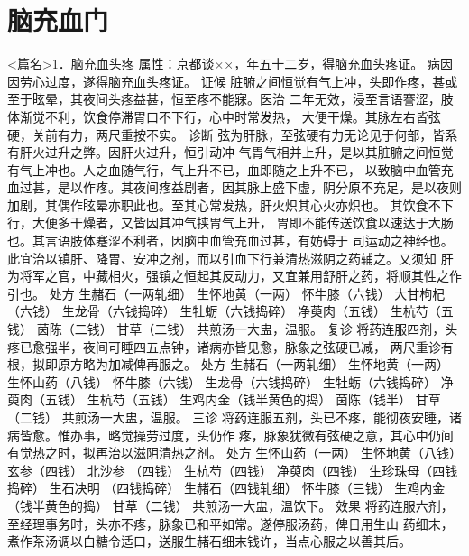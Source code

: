 \documentclass[a4paper,12pt,UTF8,twoside]{ctexbook}
\begin{document}
\chapter{脑充血门}
<篇名>1．脑充血头疼
属性：京都谈××，年五十二岁，得脑充血头疼证。 
病因 因劳心过度，遂得脑充血头疼证。 
证候 脏腑之间恒觉有气上冲，头即作疼，甚或至于眩晕，其夜间头疼益甚，恒至疼不能寐。医治 
二年无效，浸至言语謇涩，肢体渐觉不利，饮食停滞胃口不下行，心中时常发热， 
大便干燥。其脉左右皆弦硬，关前有力，两尺重按不实。 
诊断 弦为肝脉，至弦硬有力无论见于何部，皆系有肝火过升之弊。因肝火过升，恒引动冲 
气胃气相并上升，是以其脏腑之间恒觉有气上冲也。人之血随气行，气上升不已，血即随之上升不已， 
以致脑中血管充血过甚，是以作疼。其夜间疼益剧者，因其脉上盛下虚，阴分原不充足，是以夜则 
加剧，其偶作眩晕亦职此也。至其心常发热，肝火炽其心火亦炽也。 
其饮食不下行，大便多干燥者，又皆因其冲气挟胃气上升， 
胃即不能传送饮食以速达于大肠也。其言语肢体蹇涩不利者，因脑中血管充血过甚，有妨碍于 
司运动之神经也。此宜治以镇肝、降胃、安冲之剂，而以引血下行兼清热滋阴之药辅之。又须知 
肝为将军之官，中藏相火，强镇之恒起其反动力，又宜兼用舒肝之药，将顺其性之作引也。 
处方 生赭石（一两轧细） 生怀地黄（一两） 怀牛膝（六钱） 大甘枸杞（六钱） 
生龙骨（六钱捣碎） 生牡蛎（六钱捣碎） 净萸肉（五钱） 生杭芍（五钱） 
茵陈（二钱） 甘草（二钱） 
共煎汤一大盅，温服。 
复诊 将药连服四剂，头疼已愈强半，夜间可睡四五点钟，诸病亦皆见愈，脉象之弦硬已减， 
两尺重诊有根，拟即原方略为加减俾再服之。 
处方 生赭石（一两轧细） 生怀地黄（一两） 生怀山药（八钱） 怀牛膝（六钱） 
生龙骨（六钱捣碎） 生牡蛎（六钱捣碎） 净萸肉（五钱） 生杭芍（五钱） 
生鸡内金（钱半黄色的捣） 茵陈（钱半） 甘草（二钱） 
共煎汤一大盅，温服。 
三诊 将药连服五剂，头已不疼，能彻夜安睡，诸病皆愈。惟办事，略觉操劳过度，头仍作 
疼，脉象犹微有弦硬之意，其心中仍间有觉热之时，拟再治以滋阴清热之剂。 
处方 生怀山药（一两） 生怀地黄（八钱） 玄参（四钱） 北沙参 
（四钱） 生杭芍（四钱） 净萸肉（四钱） 生珍珠母（四钱捣碎） 生石决明 
（四钱捣碎） 生赭石（四钱轧细） 怀牛膝（三钱） 生鸡内金（钱半黄色的捣） 甘草（二钱） 
共煎汤一大盅，温饮下。 
效果 将药连服六剂，至经理事务时，头亦不疼，脉象已和平如常。遂停服汤药，俾日用生山 
药细末，煮作茶汤调以白糖令适口，送服生赭石细末钱许，当点心服之以善其后。 
\end{document}
